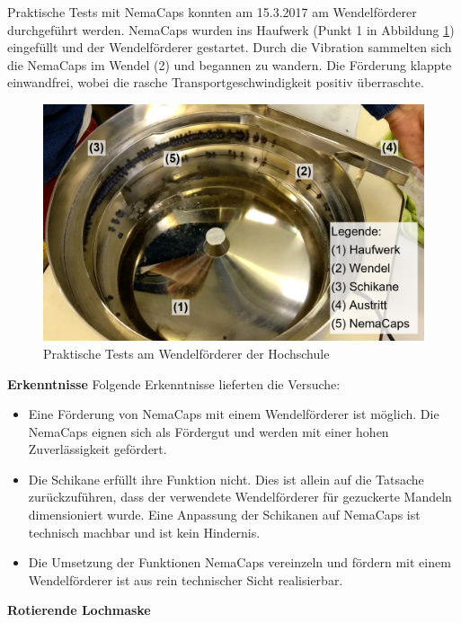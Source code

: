 Praktische Tests mit NemaCaps konnten am 15.3.2017 am Wendelförderer durchgeführt werden. NemaCaps wurden ins Haufwerk (Punkt 1 in Abbildung \ref{fig:wendelfoerderer}) eingefüllt und der Wendelförderer gestartet. Durch die Vibration sammelten sich die NemaCaps im Wendel (2) und begannen zu wandern. Die Förderung klappte einwandfrei, wobei die rasche Transportgeschwindigkeit positiv überraschte. 
\begin{figure}[H]
	\includegraphics[width=1\textwidth]{Illustrationen/5-Konzept/wendelfoerderer.PNG}
	\caption{Praktische Tests am Wendelförderer der Hochschule}
	\label{fig:wendelfoerderer}
\end{figure}
\textbf{Erkenntnisse}
\newline
Folgende Erkenntnisse lieferten die Versuche:
\begin{itemize}
	\item Eine Förderung von NemaCaps mit einem Wendelförderer ist möglich. Die NemaCaps eignen sich als Fördergut und werden mit einer hohen Zuverlässigkeit gefördert.
	
	\item Die Schikane erfüllt ihre Funktion nicht. Dies ist allein auf die Tatsache zurückzuführen, dass der verwendete  Wendelförderer für gezuckerte Mandeln dimensioniert wurde. Eine Anpassung der Schikanen auf NemaCaps ist technisch machbar und ist kein Hindernis.
	
	\item Die Umsetzung der Funktionen NemaCaps vereinzeln und fördern mit einem Wendelförderer ist aus rein technischer Sicht realisierbar.
\end{itemize} 
\newpage
\textbf{Rotierende Lochmaske}
\newline
